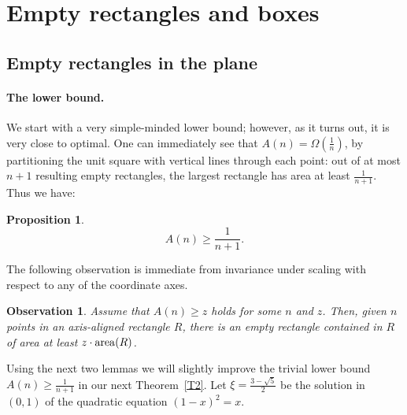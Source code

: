 \documentclass[11pt]{article}
\newtheorem{proposition}{Proposition}
\newtheorem{observation}{Observation}
\begin{document}
\section{Empty rectangles and boxes}\label{sec:rectangle}


\subsection{Empty rectangles in the plane}\label{subsec:plane}


\paragraph{The lower bound.}
We start with a very simple-minded lower bound; however, as it turns
out, it is very close to optimal.
One can immediately see that $A(n) =\Omega(\frac{1}{n})$, by
partitioning the unit square with vertical lines through each point:
out of at most $n+1$ resulting empty rectangles, the largest rectangle
has area at least $\frac{1}{n+1}$. Thus we have:

\begin{proposition} \label{P1}
\begin{equation} \label{E3}
A(n) \geq \frac{1}{n+1}. 
\end{equation}
\end{proposition}


The following observation is immediate from invariance under scaling 
with respect to any of the coordinate axes. 

\begin{observation} \label{O1}
Assume that $A(n) \geq z$ holds for some $n$ and $z$.
Then, given $n$ points in an axis-aligned rectangle $R$, there is an empty
rectangle contained in $R$ of area at least $z \cdot {\rm area}(R)$. 
\end{observation}



Using the next two lemmas we will slightly improve the trivial lower bound
$A(n) \geq \frac{1}{n+1}$ in  our next Theorem~\ref{T2}. 
Let  $\xi=\frac{3-\sqrt{5}}{2}$ be the solution in $(0,1)$ of the
quadratic equation $ (1-x)^2=x$. 
\end{document}
